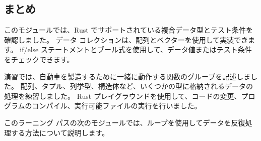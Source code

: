 \subsection{まとめ}

このモジュールでは、Rust でサポートされている複合データ型とテスト条件を確認しました。 データ コレクションは、配列とベクターを使用して実装できます。 if/else ステートメントとブール式を使用して、データ値またはテスト条件をチェックできます。

演習では、自動車を製造するために一緒に動作する関数のグループを記述しました。 配列、タプル、列挙型、構造体など、いくつかの型に格納されるデータの処理を練習しました。 Rust プレイグラウンドを使用して、コードの変更、プログラムのコンパイル、実行可能ファイルの実行を行いました。

このラーニング パスの次のモジュールでは、ループを使用してデータを反復処理する方法について説明します。

